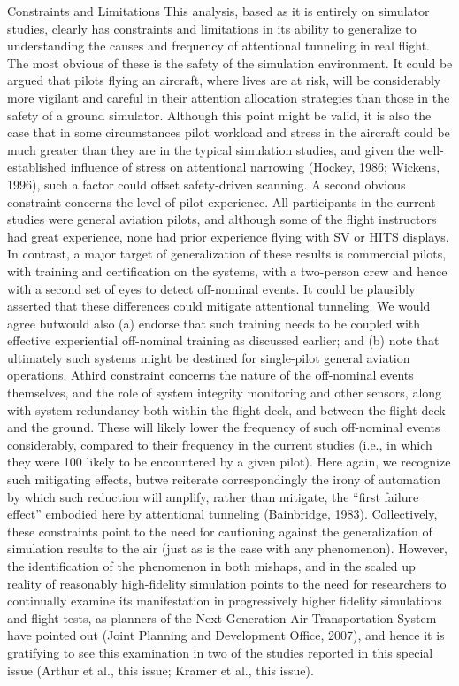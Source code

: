 \documentclass[utf8,bachelor,manualbib]{gradu3}
\begin{document}
Constraints and Limitations
This analysis, based as it is entirely on simulator studies, clearly has constraints
and limitations in its ability to generalize to understanding the causes and frequency
of attentional tunneling in real flight. The most obvious of these is the safety of the simulation environment. It could be argued that pilots flying an aircraft,
where lives are at risk, will be considerably more vigilant and careful in their
attention allocation strategies than those in the safety of a ground simulator. Although
this point might be valid, it is also the case that in some circumstances pilot
workload and stress in the aircraft could be much greater than they are in the typical
simulation studies, and given the well-established influence of stress on
attentional narrowing (Hockey, 1986; Wickens, 1996), such a factor could offset
safety-driven scanning.
A second obvious constraint concerns the level of pilot experience. All participants
in the current studies were general aviation pilots, and although some of the
flight instructors had great experience, none had prior experience flying with SV or
HITS displays. In contrast, a major target of generalization of these results is commercial
pilots, with training and certification on the systems, with a two-person crew
and hence with a second set of eyes to detect off-nominal events. It could be plausibly
asserted that these differences could mitigate attentional tunneling. We would
agree butwould also (a) endorse that such training needs to be coupled with effective
experiential off-nominal training as discussed earlier; and (b) note that ultimately
such systems might be destined for single-pilot general aviation operations.
Athird constraint concerns the nature of the off-nominal events themselves, and
the role of system integrity monitoring and other sensors, along with system redundancy
both within the flight deck, and between the flight deck and the ground.
These will likely lower the frequency of such off-nominal events considerably,
compared to their frequency in the current studies (i.e., in which they were 100%
likely to be encountered by a given pilot). Here again, we recognize such mitigating
effects, butwe reiterate correspondingly the irony of automation by which such
reduction will amplify, rather than mitigate, the “first failure effect” embodied here
by attentional tunneling (Bainbridge, 1983).
Collectively, these constraints point to the need for cautioning against the generalization
of simulation results to the air (just as is the case with any phenomenon).
However, the identification of the phenomenon in both mishaps, and in the
scaled up reality of reasonably high-fidelity simulation points to the need for researchers
to continually examine its manifestation in progressively higher fidelity
simulations and flight tests, as planners of the Next Generation Air Transportation
System have pointed out (Joint Planning and Development Office, 2007), and
hence it is gratifying to see this examination in two of the studies reported in this
special issue (Arthur et al., this issue; Kramer et al., this issue). \citep{wickens2009}
\end{document}
